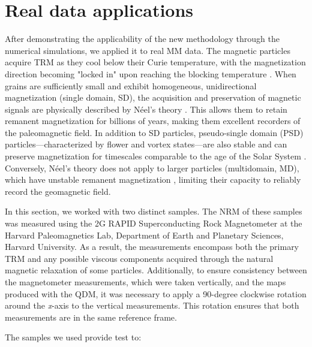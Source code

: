 \section{Real data applications}

After demonstrating the applicability of the new methodology through the numerical simulations, we applied it to real MM data. The magnetic particles \citep[most commonly magnetite,][]{OReilly1984} acquire TRM as they cool below their Curie temperature, with the magnetization direction becoming "locked in" upon reaching the blocking temperature \citep{Dunlop1997}. When grains are sufficiently small and exhibit homogeneous, unidirectional magnetization (single domain, SD), the acquisition and preservation of magnetic signals are physically described by Néel’s theory \citep{Neel1949, Neel1955}. This allows them to retain remanent magnetization for billions of years, making them excellent recorders of the paleomagnetic field. In addition to SD particles, pseudo-single domain (PSD) particles—characterized by flower and vortex states—are also stable and can preserve magnetization for timescales comparable to the age of the Solar System \citep{Nagy2017, Lascu2018,Bellon-2024a}. Conversely, Néel’s theory does not apply to larger particles (multidomain, MD), which have unstable remanent magnetization \citep[e.g., due to viscous domain reorganization,][]{DeGroot2014}, limiting their capacity to reliably record the geomagnetic field.

In this section, we worked with two distinct samples. The NRM of these samples was measured using the 2G RAPID Superconducting Rock Magnetometer at the Harvard Paleomagnetics Lab, Department of Earth and Planetary Sciences, Harvard University. As a result, the measurements encompass both the primary TRM and any possible viscous components acquired through the natural magnetic relaxation of some particles. Additionally, to ensure consistency between the magnetometer measurements, which were taken vertically, and the maps produced with the QDM, it was necessary to apply a 90-degree clockwise rotation around the \textit{x}-axis to the vertical measurements. This rotation ensures that both measurements are in the same reference frame.

The samples we used provide test to:

